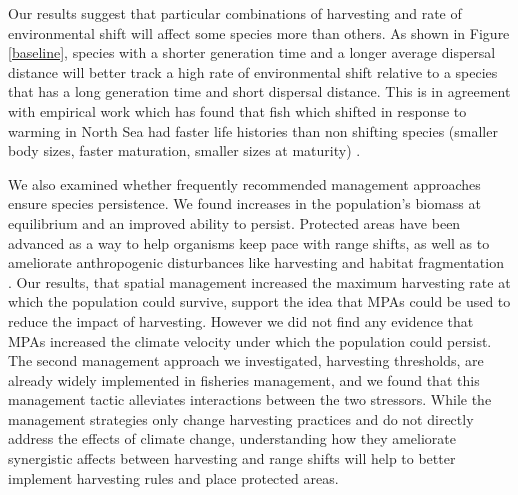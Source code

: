 \documentclass[12pt,english]{article}
\begin{document}
\begin{spacing}{1.9}
\begin{flushleft}


Our results suggest that particular combinations of harvesting and rate of environmental shift will affect some species more than others. As shown in Figure \ref{baseline}, species with a shorter generation time and a longer average dispersal distance will better track a high rate of environmental shift relative to a species that has a long generation time and short dispersal distance. This is in agreement with empirical work which has found that fish which shifted in response to warming in North Sea had faster life histories than non shifting species (smaller body sizes, faster maturation, smaller sizes at maturity) \citep{Perryetal2005}. 

We also examined whether frequently recommended management approaches ensure species persistence. We found increases in the population's biomass at equilibrium and an improved ability to persist. Protected areas have been advanced as a way to help organisms keep pace with range shifts, as well as to ameliorate anthropogenic disturbances like harvesting and habitat fragmentation \citep{Lawleretal2010, Hannahetal2007,Botsfordetal2001, Gaylordetal2005, HastingsBotsford2003,Thomasetal2012}. Our results, that spatial management increased the maximum harvesting rate at which the population could survive, support the idea that MPAs could be used to reduce the impact of harvesting. However we did not find any evidence that MPAs increased the climate velocity under which the population could persist. The second management approach we investigated, harvesting thresholds, are already widely implemented in fisheries management, and we found that this management tactic alleviates interactions between the two stressors.   While the management strategies only change harvesting practices and do not directly address the effects of climate change, understanding how they ameliorate synergistic affects between harvesting and range shifts will help to better implement harvesting rules and place protected areas.



\end{flushleft}
\end{spacing}
\end{document}
